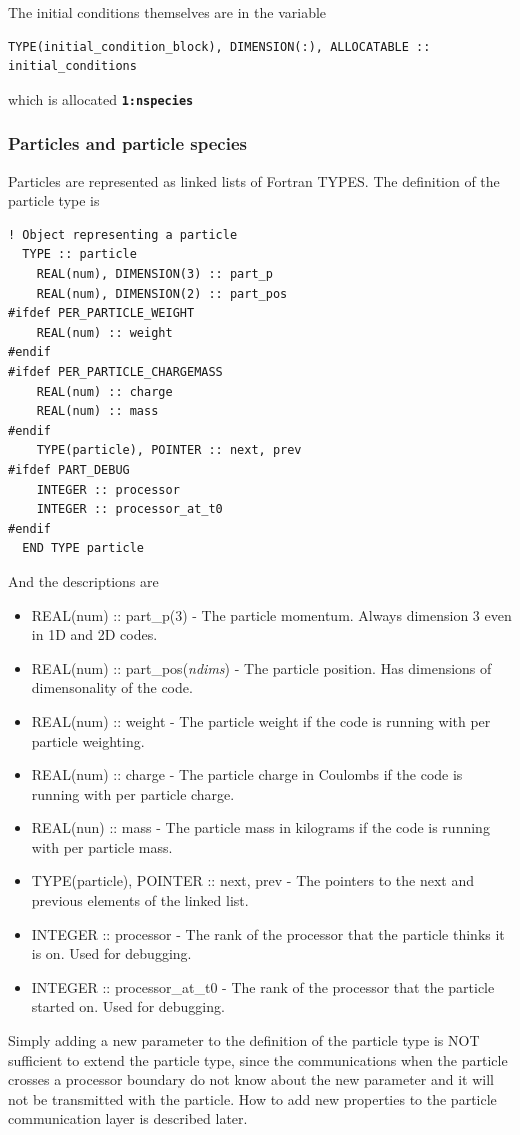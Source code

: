 \documentclass[12pt,a4paper]{article}
\newcommand{\simpleboxverbatim}{\begin{Verbatim}[obeytabs=true,frame=single,
  framerule=0.5mm,rulecolor=\color{warwickmid},formatcom=\color{black}]}
\newcommand{\inlinecode}[1]{{\color{warwickred} \bf\texttt{#1}}}
\begin{document}
The initial conditions themselves are in the variable
\simpleboxverbatim
TYPE(initial_condition_block), DIMENSION(:), ALLOCATABLE :: initial_conditions
\end{Verbatim}
which is allocated \inlinecode{1:nspecies}

\subsubsection{Particles and particle species}
Particles are represented as linked lists of Fortran TYPES. The definition of
the particle type is
\simpleboxverbatim
  ! Object representing a particle
  TYPE :: particle
    REAL(num), DIMENSION(3) :: part_p
    REAL(num), DIMENSION(2) :: part_pos
#ifdef PER_PARTICLE_WEIGHT
    REAL(num) :: weight
#endif
#ifdef PER_PARTICLE_CHARGEMASS
    REAL(num) :: charge
    REAL(num) :: mass
#endif
    TYPE(particle), POINTER :: next, prev
#ifdef PART_DEBUG
    INTEGER :: processor
    INTEGER :: processor_at_t0
#endif
  END TYPE particle
\end{Verbatim}
And the descriptions are
\begin{itemize}
\item REAL(num) :: part\_p(3) - The particle momentum. Always dimension 3 even
  in 1D and 2D codes.
\item REAL(num) :: part\_pos({\it ndims}) - The particle position. Has
  dimensions of dimensonality of the code.
\item REAL(num) :: weight - The particle weight if the code is running with
  per particle weighting.
\item REAL(num) :: charge - The particle charge in Coulombs if the code is
  running with per particle charge.
\item REAL(nun) :: mass - The particle mass in kilograms if the code is
  running with per particle mass.
\item TYPE(particle), POINTER :: next, prev - The pointers to the next and
  previous elements of the linked list.
\item INTEGER :: processor - The rank of the processor that the particle
  thinks it is on. Used for debugging.
\item INTEGER :: processor\_at\_t0 - The rank of the processor that the
  particle started on. Used for debugging.
\end{itemize}
Simply adding a new parameter to the definition of the particle type is NOT
sufficient to extend the particle type, since the communications when the
particle crosses a processor boundary do not know about the new parameter and
it will not be transmitted with the particle. How to add new properties to the
particle communication layer is described later.\\
\end{document}
